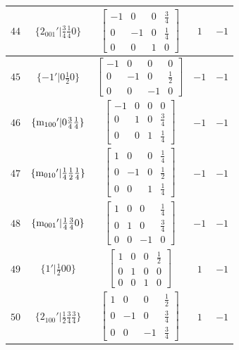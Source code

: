 \documentclass[fleqn,8pt]{jsarticle}
\begin{document}
\begin{longtable}{ccccc}
$ 44 $ & $ \{2{}_{001}{}'|\frac{3}{4} \frac{1}{4} 0\} $ & $ \begin{bmatrix} -1 & 0 & 0 & \frac{3}{4} \\ 0 & -1 & 0 & \frac{1}{4} \\ 0 & 0 & 1 & 0 \end{bmatrix} $ & $ 1 $ & $ -1 $ \\ \hline
$ 45 $ & $ \{-1{}'|0 \frac{1}{2} 0\} $ & $ \begin{bmatrix} -1 & 0 & 0 & 0 \\ 0 & -1 & 0 & \frac{1}{2} \\ 0 & 0 & -1 & 0 \end{bmatrix} $ & $ -1 $ & $ -1 $ \\ \hline
$ 46 $ & $ \{{\rm m}_{100}{}'|0 \frac{3}{4} \frac{1}{4}\} $ & $ \begin{bmatrix} -1 & 0 & 0 & 0 \\ 0 & 1 & 0 & \frac{3}{4} \\ 0 & 0 & 1 & \frac{1}{4} \end{bmatrix} $ & $ -1 $ & $ -1 $ \\ \hline
$ 47 $ & $ \{{\rm m}_{010}{}'|\frac{1}{4} \frac{1}{2} \frac{1}{4}\} $ & $ \begin{bmatrix} 1 & 0 & 0 & \frac{1}{4} \\ 0 & -1 & 0 & \frac{1}{2} \\ 0 & 0 & 1 & \frac{1}{4} \end{bmatrix} $ & $ -1 $ & $ -1 $ \\ \hline
$ 48 $ & $ \{{\rm m}_{001}{}'|\frac{1}{4} \frac{3}{4} 0\} $ & $ \begin{bmatrix} 1 & 0 & 0 & \frac{1}{4} \\ 0 & 1 & 0 & \frac{3}{4} \\ 0 & 0 & -1 & 0 \end{bmatrix} $ & $ -1 $ & $ -1 $ \\ \hline
$ 49 $ & $ \{1{}'|\frac{1}{2} 0 0\} $ & $ \begin{bmatrix} 1 & 0 & 0 & \frac{1}{2} \\ 0 & 1 & 0 & 0 \\ 0 & 0 & 1 & 0 \end{bmatrix} $ & $ 1 $ & $ -1 $ \\ \hline
$ 50 $ & $ \{2{}_{100}{}'|\frac{1}{2} \frac{3}{4} \frac{3}{4}\} $ & $ \begin{bmatrix} 1 & 0 & 0 & \frac{1}{2} \\ 0 & -1 & 0 & \frac{3}{4} \\ 0 & 0 & -1 & \frac{3}{4} \end{bmatrix} $ & $ 1 $ & $ -1 $ \\ \hline

\end{longtable}
\end{document}
